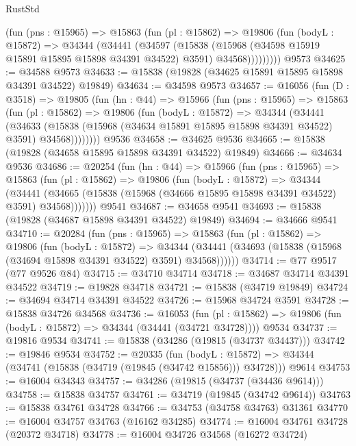 \begin{lexlean}{RustStd}
\begin{coremodule}
          (fun (pns : @15965) =>
          @15863
            (fun (pl : @15862) =>
            @19806
              (fun (bodyL : @15872) =>
              @34344
                (@34441
                  (@34597
                    (@15838
                      (@15968 (@34598 @15919 @15891 @15895 @15898 @34391 @34522) @3591)
                      @34568)))))))))
    @9573
@34625 := @34588 @9573
@34633 := @15838 (@19828 (@34625 @15891 @15895 @15898 @34391 @34522) @19849)
@34634 := @34598 @9573
@34657 := @16056
    (fun (D : @3518) =>
    @19805
      (fun (hn : @44) =>
      @15966
        (fun (pns : @15965) =>
        @15863
          (fun (pl : @15862) =>
          @19806
            (fun (bodyL : @15872) =>
            @34344
              (@34441
                (@34633
                  (@15838 (@15968 (@34634 @15891 @15895 @15898 @34391 @34522) @3591) @34568))))))))
    @9536
@34658 := @34625 @9536
@34665 := @15838 (@19828 (@34658 @15895 @15898 @34391 @34522) @19849)
@34666 := @34634 @9536
@34686 := @20254
    (fun (hn : @44) =>
    @15966
      (fun (pns : @15965) =>
      @15863
        (fun (pl : @15862) =>
        @19806
          (fun (bodyL : @15872) =>
          @34344
            (@34441
              (@34665 (@15838 (@15968 (@34666 @15895 @15898 @34391 @34522) @3591) @34568)))))))
    @9541
@34687 := @34658 @9541
@34693 := @15838 (@19828 (@34687 @15898 @34391 @34522) @19849)
@34694 := @34666 @9541
@34710 := @20284
    (fun (pns : @15965) =>
    @15863
      (fun (pl : @15862) =>
      @19806
        (fun (bodyL : @15872) =>
        @34344 (@34441 (@34693 (@15838 (@15968 (@34694 @15898 @34391 @34522) @3591) @34568))))))
@34714 := @77 @9517 (@77 @9526 @84)
@34715 := @34710 @34714
@34718 := @34687 @34714 @34391 @34522
@34719 := @19828 @34718
@34721 := @15838 (@34719 @19849)
@34724 := @34694 @34714 @34391 @34522
@34726 := @15968 @34724 @3591
@34728 := @15838 @34726 @34568
@34736 := @16053
    (fun (pl : @15862) => @19806 (fun (bodyL : @15872) => @34344 (@34441 (@34721 @34728))))
    @9534
@34737 := @19816 @9534
@34741 := @15838 (@34286 (@19815 (@34737 @34437)))
@34742 := @19846 @9534
@34752 := @20335
    (fun (bodyL : @15872) => @34344 (@34741 (@15838 (@34719 (@19845 (@34742 @15856))) @34728)))
    @9614
@34753 := @16004 @34343
@34757 := @34286 (@19815 (@34737 (@34436 @9614)))
@34758 := @15838 @34757
@34761 := @34719 (@19845 (@34742 @9614))
@34763 := @15838 @34761 @34728
@34766 := @34753 (@34758 @34763) @31361
@34770 := @16004 @34757 @34763 (@16162 @34285)
@34774 := @16004 @34761 @34728 (@20372 @34718)
@34778 := @16004 @34726 @34568 (@16272 @34724)

\end{coremodule}
\end{lexlean}

